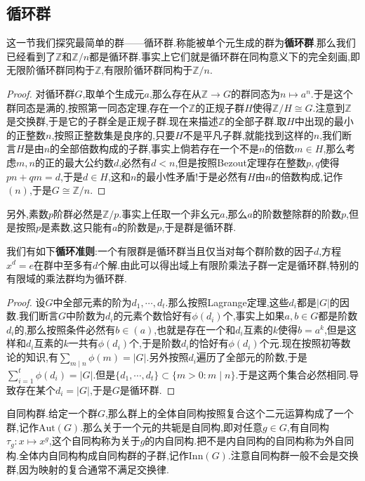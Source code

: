 \subsection{循环群}

这一节我们探究最简单的群——循环群.称能被单个元生成的群为\textbf{循环群}.那么我们已经看到了$\mathbb{Z}$和$\mathbb{Z}/n$都是循环群.事实上它们就是循环群在同构意义下的完全刻画,即无限阶循环群同构于$\mathbb{Z}$,有限阶循环群同构于$\mathbb{Z}/n$.
\begin{proof}
	
	对循环群$G$,取单个生成元$a$,那么存在从$\mathbb{Z}\to G$的群同态为$n\mapsto a^n$.于是这个群同态是满的,按照第一同态定理,存在一个$\mathbb{Z}$的正规子群$H$使得$\mathbb{Z}/H\cong G$.注意到$\mathbb{Z}$是交换群,于是它的子群全是正规子群.现在来描述$\mathbb{Z}$的全部子群.取$H$中出现的最小的正整数$n$,按照正整数集是良序的,只要$H$不是平凡子群,就能找到这样的$n$,我们断言$H$是由$n$的全部倍数构成的子群,事实上倘若存在一个不是$n$的倍数$m\in H$,那么考虑$m,n$的正的最大公约数$d$,必然有$d<n$,但是按照Bezout定理存在整数$p,q$使得$pn+qm=d$,于是$d\in H$,这和$n$的最小性矛盾!于是必然有$H$由$n$的倍数构成,记作$(n)$,于是$G\cong\mathbb{Z}/n$.
\end{proof}

另外,素数$p$阶群必然是$\mathbb{Z}/p$.事实上任取一个非幺元$a$,那么$a$的阶数整除群的阶数$p$,但是按照$p$是素数,这只能有$a$的阶数是$p$,于是群是循环群.

我们有如下\textbf{循环准则}:一个有限群是循环群当且仅当对每个群阶数的因子$d$,方程$x^d=e$在群中至多有$d$个解.由此可以得出域上有限阶乘法子群一定是循环群,特别的有限域的乘法群均为循环群.
\begin{proof}
	
	设$G$中全部元素的阶为$d_1,\cdots,d_t$.那么按照Lagrange定理,这些$d_i$都是$|G|$的因数.我们断言$G$中阶数为$d_i$的元素个数恰好有$\phi(d_i)$个,事实上如果$a,b\in G$都是阶数$d_i$的,那么按照条件必然有$b\in(a)$,也就是存在一个和$d_i$互素的$k$使得$b=a^k$,但是这样和$d_i$互素的$k$一共有$\phi(d_i)$个,于是阶数$d_i$的恰好有$\phi(d_i)$个元.现在按照初等数论的知识,有$\sum_{m\mid n}\phi(m)=|G|$.另外按照$d_i$遍历了全部元的阶数,于是$\sum_ {i=1}^{t}\phi(d_i)=|G|$.但是$\{d_1,\cdots,d_t\}\subset\{m>0:m\mid n\}$.于是这两个集合必然相同.导致存在某个$d_i=|G|$,于是$G$是循环群.
\end{proof}

自同构群.给定一个群$G$,那么群上的全体自同构按照复合这个二元运算构成了一个群,记作$\mathrm{Aut}(G)$.那么关于一个元的共轭是自同构,即对任意$g\in G$,有自同构$\tau_g:x\mapsto x^g$,这个自同构称为关于$g$的内自同构.把不是内自同构的自同构称为外自同构.全体内自同构构成自同构群的子群,记作$\mathrm{Inn}(G)$.注意自同构群一般不会是交换群,因为映射的复合通常不满足交换律.

